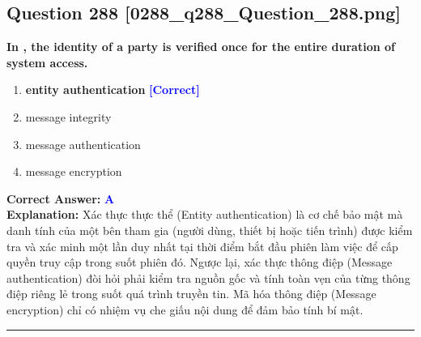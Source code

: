 \documentclass[11pt,a4paper]{article}
\begin{document}
\begin{minipage}{\textwidth}
\subsection*{Question 288 \quad \footnotesize{[0288\_q288\_Question\_288.png]}}
\noindent \textbf{In , the identity of a party is verified once for the entire duration of system access.}

\begin{enumerate}[label=\Alph*.]
    \item \textbf{entity authentication} \hfill \textcolor{blue}{\textbf{[Correct]}}
    \item message integrity
    \item message authentication
    \item message encryption
\end{enumerate}

\noindent \textbf{Correct Answer:} \textcolor{blue}{\textbf{A}} \\[2pt]
\noindent \textbf{Explanation:} Xác thực thực thể (Entity authentication) là cơ chế bảo mật mà danh tính của một bên tham gia (người dùng, thiết bị hoặc tiến trình) được kiểm tra và xác minh một lần duy nhất tại thời điểm bắt đầu phiên làm việc để cấp quyền truy cập trong suốt phiên đó. Ngược lại, xác thực thông điệp (Message authentication) đòi hỏi phải kiểm tra nguồn gốc và tính toàn vẹn của từng thông điệp riêng lẻ trong suốt quá trình truyền tin. Mã hóa thông điệp (Message encryption) chỉ có nhiệm vụ che giấu nội dung để đảm bảo tính bí mật.

\par\vspace{0.3cm}
\hrule
\vspace{0.3cm}
\end{minipage}
\end{document}
